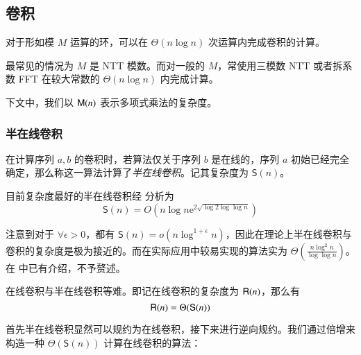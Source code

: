 \subsection{卷积}

\begin{theorem}[快速 Fourier 变换]
对于形如模 $M$ 运算的环，可以在 $\Theta(n\log n)$ 次运算内完成卷积的计算。
\end{theorem}

最常见的情况为 $M$ 是 NTT 模数。而对一般的 $M$，常使用三模数 NTT 或者拆系数 FFT 在较大常数的 $\Theta(n\log n)$ 内完成计算。

下文中，我们以 $\mathsf M(n)$ 表示多项式乘法的复杂度。

\subsubsection{半在线卷积}

\begin{definition}[半在线卷积]
在计算序列 $a,b$ 的卷积时，若算法仅关于序列 $b$ 是在线的，序列 $a$ 初始已经完全确定，那么称这一算法计算了\emph{半在线卷积}。记其复杂度为 $\mathsf S(n)$。
\end{definition}

\begin{theorem}

目前复杂度最好的半在线卷积经 \cite{relaxmul} 分析为
$$
\mathsf{S}(n) = O\left(n\log n\mathrm{e}^{2\sqrt{\log 2\log\log n}}\right)
$$
\end{theorem}

注意到对于 $\forall \epsilon > 0$，都有 $\mathsf{S}(n) = o\left(n\log^{1+\epsilon} n\right)$，因此在理论上半在线卷积与卷积的复杂度是极为接近的。而在实际应用中较易实现的算法实为 $\Theta \left( \frac{n\log ^2 n}{\log \log n} \right)$。在 \cite{nimberpoly} 中已有介绍，不予赘述。

\begin{theorem}
在线卷积与半在线卷积等难。即记在线卷积的复杂度为 $\mathsf R(n)$，那么有
$$
\mathsf R(n)=\Theta(\mathsf S(n))
$$
\end{theorem}

首先半在线卷积显然可以规约为在线卷积，接下来进行逆向规约。我们通过倍增来构造一种 $\Theta(\mathsf S(n))$ 计算在线卷积的算法：

